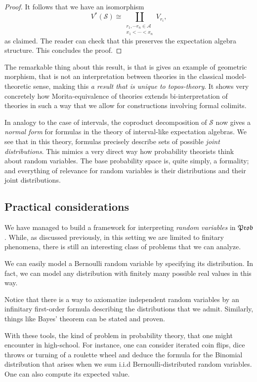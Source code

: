 \documentclass[a4paper]{amsproc}
\theoremstyle{plain}
\theoremstyle{definition}
\theoremstyle{remark}
\numberwithin{equation}{section}
\newcommand{\Prob}{\mathfrak{Prob}}
\begin{document}
\begin{proof}
    It follows that we have an isomorphism \[V^*(\mathcal{S}) \cong \coprod_{\substack{r_1, \cdots r_n \in \mathcal{A} \\ x_1 < \cdots < x_n}} V_{r_i},\] as claimed. The reader can check that this preserves the expectation algebra structure. This concludes the proof.
\end{proof}

The remarkable thing about this result, is that is gives an example of geometric morphism, that is not an interpretation between theories in the classical model-theoretic sense, making this \emph{a result that is unique to topos-theory}. It shows very concretely how Morita-equivalence of theories extends bi-interpretation of theories in such a way that we allow for constructions involving formal colimits.

In analogy to the case of intervals, the coproduct decomposition of $\mathcal{S}$ now gives a \emph{normal form} for formulas in the theory of interval-like expectation algebras. We see that in this theory, formulas precisely describe sets of possible \emph{joint distributions}. This mimics a very direct way how probability theorists think about random variables. The base probability space is, quite simply, a formality; and everything of relevance for random variables is their distributions and their joint distributions.

\subsection{Practical considerations}

We have managed to build a framework for interpreting \emph{random variables} in $\Prob$. While, as discussed previously, in this setting we are limited to finitary phenomena, there is still an interesting class of problems that we can analyze.

We can easily model a Bernoulli random variable by specifying its distribution. In fact, we can model any distribution with finitely many possible real values in this way.

Notice that there is a way to axiomatize independent random variables by an infinitary first-order formula describing the distributions that we admit. Similarly, things like Bayes' theorem can be stated and proven.

With these tools, the kind of problem in probability theory, that one might encounter in high-school. For instance, one can consider iterated coin flips, dice throws or turning of a roulette wheel and deduce the formula for the Binomial distribution that arises when we sum i.i.d Bernoulli-distributed random variables. One can also compute its expected value.
\end{document}
